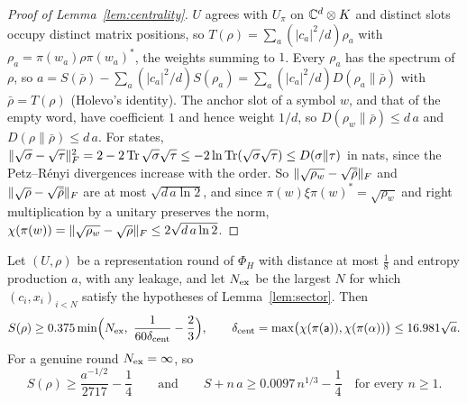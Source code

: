 \begin{proof}[Proof of Lemma~\ref{lem:centrality}]
$U$ agrees with $U_\pi$ on $\mathbb C^d\otimes K$ and distinct slots occupy distinct matrix positions, so $T(\rho)=\sum_a(|c_a|^2/d)\rho_a$ with $\rho_a=\pi(w_a)\rho\pi(w_a)^*$, the weights
summing to $1$. Every $\rho_a$ has the spectrum of $\rho$, so $a=S(\bar\rho)-\sum_a(|c_a|^2/d)S(\rho_a)=\sum_a(|c_a|^2/d)D(\rho_a\|\bar\rho)$ with $\bar\rho=T(\rho)$ (Holevo's identity). The
anchor slot of a symbol $w$, and that of the empty word, have coefficient $1$ and hence weight $1/d$, so $D(\rho_w\|\bar\rho)\le d\,a$ and $D(\rho\|\bar\rho)\le d\,a$. For states,
$\lVert \sqrt\sigma-\sqrt\tau\rVert_F^2=2-2\operatorname{Tr}\sqrt\sigma\sqrt\tau\le-2\ln\operatorname{Tr}(\sqrt\sigma\sqrt\tau)\le D(\sigma\|\tau)$ in nats, since the Petz--R\'enyi divergences increase with the order. So
$\lVert \sqrt{\rho_w}-\sqrt{\bar\rho}\rVert_F$ and $\lVert \sqrt\rho-\sqrt{\bar\rho}\rVert_F$ are at most $\sqrt{d\,a\ln2}$, and since $\pi(w)\xi\pi(w)^*=\sqrt{\rho_w}$ and right multiplication by a unitary preserves
the norm, $\chi(\pi(w))=\lVert \sqrt{\rho_w}-\sqrt\rho\rVert_F\le2\sqrt{d\,a\ln2}$.
\end{proof}

\begin{theorem}\label{thm:genuine-constants}
Let $(U,\rho)$ be a representation round of $\Phi_H$ with distance at most $\frac18$ and entropy production $a$, with any leakage, and let $N_{\rm ex}$ be
the largest $N$ for which $(c_i,x_i)_{i<N}$ satisfy the hypotheses of Lemma~\ref{lem:sector}. Then
\[
S(\rho)\ge0.375\min\Bigl(N_{\rm ex},\ \frac1{60\delta_{\rm cent}}-\frac23\Bigr),\qquad \delta_{\rm cent}=\max\bigl(\chi(\pi(\sfa)),\chi(\pi(\alpha))\bigr)\le16.981\sqrt a .
\]
For a genuine round $N_{\rm ex}=\infty$, so
\[
S(\rho)\ge\frac{a^{-1/2}}{2717}-\frac14\qquad\text{and}\qquad S+n\,a\ge0.0097\,n^{1/3}-\frac14\quad\text{for every }n\ge1 .
\]
\end{theorem}

